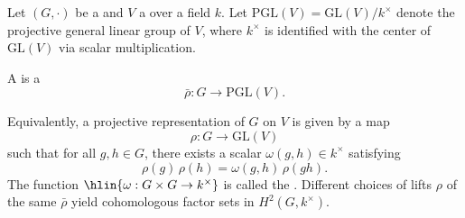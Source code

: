 \begin{definition} \label{definition:projective_representation_of_a_group_on_a_vector_space_over_a_field}

    Let $(G, \cdot)$ be a  and $V$ a  over a field $k$. Let $\mathrm{PGL}(V) = \mathrm{GL}(V)/k^\times$ denote the projective general linear group of $V$, where $k^\times$ is identified with the center of $\mathrm{GL}(V)$ via scalar multiplication.

    A  is a 
    $$\bar{\rho} : G \to \mathrm{PGL}(V).$$

    Equivalently, a projective representation of $G$ on $V$ is given by a map
    $$\rho : G \to \mathrm{GL}(V)$$
    such that for all $g, h \in G$, there exists a scalar $\omega(g, h) \in k^\times$ satisfying
    $$\rho(g)\,\rho(h) = \omega(g, h)\,\rho(gh).$$
    The function $\hlin{\omega : G \times G \to k^\times}$ is called the . Different choices of lifts $\rho$ of the same $\bar{\rho}$ yield cohomologous factor sets in $H^2(G, k^\times)$.
\end{definition}
